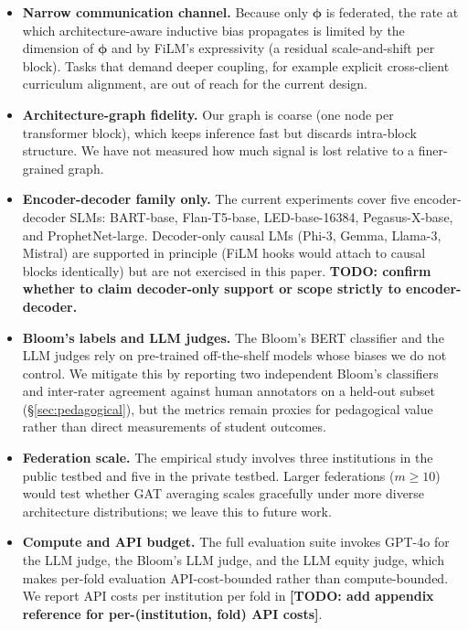 \documentclass[11pt]{article}
\theoremstyle{plain}
\theoremstyle{definition}
\theoremstyle{remark}
\newcommand{\red}[1]{\textcolor{myred}{\textbf{#1}}}
\begin{document}
\begin{itemize}[leftmargin=1.5em, itemsep=2pt]
  \item \textbf{Narrow communication channel.}
  Because only $\boldsymbol{\phi}$ is federated, the
  rate at which architecture-aware inductive bias
  propagates is limited by the dimension of
  $\boldsymbol{\phi}$ and by FiLM's expressivity (a
  residual scale-and-shift per block). Tasks that
  demand deeper coupling, for example explicit
  cross-client curriculum alignment, are out of reach
  for the current design.
  \item \textbf{Architecture-graph fidelity.} Our
  graph is coarse (one node per transformer block),
  which keeps inference fast but discards intra-block
  structure. We have not measured how much signal is
  lost relative to a finer-grained graph.
  \item \textbf{Encoder-decoder family only.} The
  current experiments cover five encoder-decoder
  SLMs: BART-base, Flan-T5-base, LED-base-16384,
  Pegasus-X-base, and ProphetNet-large. Decoder-only
  causal LMs (Phi-3, Gemma, Llama-3, Mistral) are
  supported in principle (FiLM hooks would attach
  to causal blocks identically) but are not
  exercised in this paper.
  \red{TODO: confirm whether to claim decoder-only support or scope strictly to encoder-decoder.}
  \item \textbf{Bloom's labels and LLM judges.} The
  Bloom's BERT classifier and the LLM judges rely on
  pre-trained off-the-shelf models whose biases we do
  not control. We mitigate this by reporting two
  independent Bloom's classifiers and inter-rater
  agreement against human annotators on a held-out
  subset (§\ref{sec:pedagogical}), but the metrics
  remain proxies for pedagogical value rather than
  direct measurements of student outcomes.
  \item \textbf{Federation scale.} The empirical
  study involves three institutions in the public
  testbed and five in the private testbed. Larger
  federations ($m \geq 10$) would test whether GAT
  averaging scales gracefully under more diverse
  architecture distributions; we leave this to
  future work.
  \item \textbf{Compute and API budget.} The full
  evaluation suite invokes GPT-4o for the LLM judge,
  the Bloom's LLM judge, and the LLM equity judge,
  which makes per-fold evaluation API-cost-bounded
  rather than compute-bounded. We report API costs
  per institution per fold in
  \red{[TODO: add appendix reference for per-(institution, fold) API costs]}.
\end{itemize}
\end{document}
